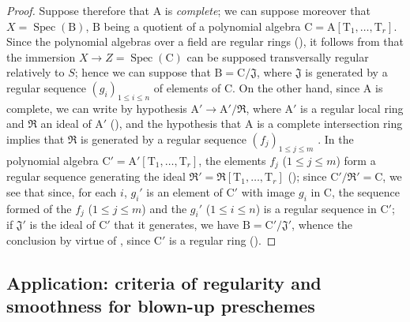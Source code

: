 \begin{proof}
Suppose therefore that $\mathrm{A}$ is \emph{complete}; we can suppose moreover that $X=\operatorname{Spec}(\mathrm{B})$, $\mathrm{B}$ being a quotient of a polynomial algebra $\mathrm{C}=\mathrm{A}[\mathrm{T}_1,\ldots,\mathrm{T}_r]$.
Since the polynomial algebras over a field are regular rings (), it follows from  that the immersion $X\to Z=\operatorname{Spec}(\mathrm{C})$ can be supposed transversally regular relatively to $S$; hence we can suppose that $\mathrm{B}=\mathrm{C}/\mathfrak{J}$, where $\mathfrak{J}$ is generated by a regular sequence $(g_i)_{1\leq i\leq n}$ of elements of $\mathrm{C}$.
On the other hand, since $\mathrm{A}$ is complete, we can write by hypothesis $\mathrm{A}'\to\mathrm{A}'/\mathfrak{R}$, where $\mathrm{A}'$ is a regular local ring and $\mathfrak{R}$ an ideal of $\mathrm{A}'$ (), and the hypothesis that $\mathrm{A}$ is a complete intersection ring implies that $\mathfrak{R}$ is generated by a regular sequence $(f_j)_{1\leq j\leq m}$ .
In the polynomial algebra $\mathrm{C}'=\mathrm{A}'[\mathrm{T}_1,\ldots,\mathrm{T}_r]$, the elements $f_j$ ($1\leq j\leq m$) form a regular sequence generating the ideal $\mathfrak{R}'=\mathfrak{R}[\mathrm{T}_1,\ldots,\mathrm{T}_r]$ (); since $\mathrm{C}'/\mathfrak{R}'=\mathrm{C}$, we see that since, for each $i$, $g_i'$ is an element of $\mathrm{C}'$ with image $g_i$ in $\mathrm{C}$, the sequence formed of the $f_j$ ($1\leq j\leq m$) and the $g_i'$ ($1\leq i\leq n$) is a regular sequence in $\mathrm{C}'$; if $\mathfrak{J}'$ is the ideal of $\mathrm{C}'$ that it generates, we have $\mathrm{B}=\mathrm{C}'/\mathfrak{J}'$, whence the conclusion by virtue of , since $\mathrm{C}'$ is a regular ring ().
\end{proof}

\subsection{Application: criteria of regularity and smoothness for blown-up preschemes}
\label{subsection:IV.19.4}



